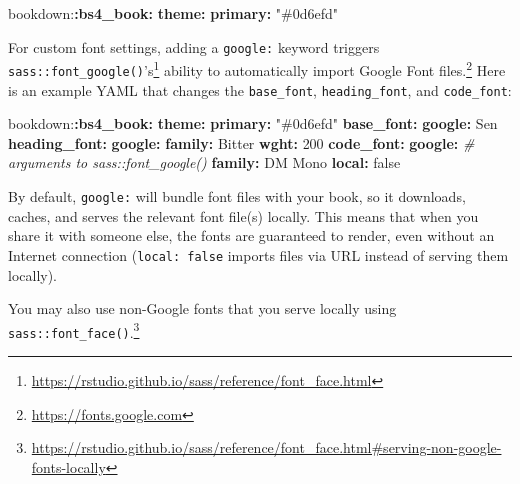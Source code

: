 \documentclass[
  12pt,
]{krantz}
\newenvironment{Shaded}{\begin{snugshade}}{\end{snugshade}}
\newcommand{\AttributeTok}[1]{\textcolor[rgb]{0.13,0.29,0.53}{#1}}
\newcommand{\CharTok}[1]{\textcolor[rgb]{0.31,0.60,0.02}{#1}}
\newcommand{\CommentTok}[1]{\textcolor[rgb]{0.56,0.35,0.01}{\textit{#1}}}
\newcommand{\DecValTok}[1]{\textcolor[rgb]{0.00,0.00,0.81}{#1}}
\newcommand{\FunctionTok}[1]{\textcolor[rgb]{0.13,0.29,0.53}{\textbf{#1}}}
\newcommand{\KeywordTok}[1]{\textcolor[rgb]{0.13,0.29,0.53}{\textbf{#1}}}
\newcommand{\StringTok}[1]{\textcolor[rgb]{0.31,0.60,0.02}{#1}}
\renewcommand{\href}[2]{#2\footnote{\url{#1}}}
\theoremstyle{definition}
\theoremstyle{definition}
\theoremstyle{definition}
\theoremstyle{definition}
\theoremstyle{remark}
\begin{document}
\begin{Shaded}
\begin{Highlighting}[]
\AttributeTok{bookdown:}\FunctionTok{:bs4\_book}\KeywordTok{:}
\AttributeTok{  }\FunctionTok{theme}\KeywordTok{:}
\AttributeTok{    }\FunctionTok{primary}\KeywordTok{:}\AttributeTok{ }\StringTok{"\#0d6efd"}
\end{Highlighting}
\end{Shaded}

For custom font settings, adding a \texttt{google:} keyword triggers \href{https://rstudio.github.io/sass/reference/font_face.html}{\texttt{sass::font\_google()}'s} ability to automatically import \href{https://fonts.google.com}{Google Font files.} Here is an example YAML that changes the \texttt{base\_font}, \texttt{heading\_font}, and \texttt{code\_font}:

\begin{Shaded}
\begin{Highlighting}[]
\AttributeTok{bookdown:}\FunctionTok{:bs4\_book}\KeywordTok{:}
\AttributeTok{  }\FunctionTok{theme}\KeywordTok{:}
\AttributeTok{    }\FunctionTok{primary}\KeywordTok{:}\AttributeTok{ }\StringTok{"\#0d6efd"}
\AttributeTok{    }\FunctionTok{base\_font}\KeywordTok{:}
\AttributeTok{      }\FunctionTok{google}\KeywordTok{:}\AttributeTok{ Sen}
\AttributeTok{    }\FunctionTok{heading\_font}\KeywordTok{:}
\AttributeTok{      }\FunctionTok{google}\KeywordTok{:}
\AttributeTok{        }\FunctionTok{family}\KeywordTok{:}\AttributeTok{ Bitter}
\AttributeTok{        }\FunctionTok{wght}\KeywordTok{:}\AttributeTok{ }\DecValTok{200}
\AttributeTok{    }\FunctionTok{code\_font}\KeywordTok{:}
\AttributeTok{      }\FunctionTok{google}\KeywordTok{:}
\CommentTok{        \# arguments to sass::font\_google()}
\AttributeTok{        }\FunctionTok{family}\KeywordTok{:}\AttributeTok{ DM Mono}
\AttributeTok{        }\FunctionTok{local}\KeywordTok{:}\AttributeTok{ }\CharTok{false}
\end{Highlighting}
\end{Shaded}

By default, \texttt{google:} will bundle font files with your book, so it downloads, caches, and serves the relevant font file(s) locally. This means that when you share it with someone else, the fonts are guaranteed to render, even without an Internet connection (\texttt{local:\ false} imports files via URL instead of serving them locally).

You may also use non-Google fonts that you serve locally using \href{https://rstudio.github.io/sass/reference/font_face.html\#serving-non-google-fonts-locally}{\texttt{sass::font\_face()}.}
\end{document}
